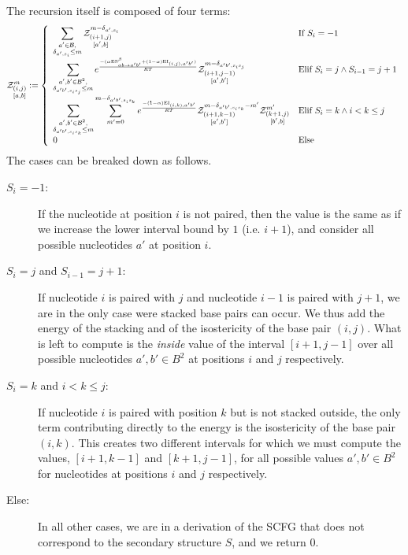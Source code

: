The recursion itself is composed of four terms:
$$
	\Z{i,j}{m}{a,b}:=\left\{
  \begin{array}{ll}
  		\displaystyle
      \sum_{\substack{a'\in \B,\\ \Kron_{a',s_i}\le m}}  
      \Z{i+1,j}{m-\Kron_{a',s_i}}{a',b} & \text{If }S_{i}=-1\\
      \displaystyle
      \sum_{\substack{a',b'\in \B^2,\\ \Kron_{a'b',s_is_j}\le m}}
			 e^{\frac{-(\alpha \text{ES}^\beta_{a b \to a' b'}+(1-\alpha)\text{EI}_{(i,j),a'b'})}{RT}}
			 \Z{i+1,j-1}{m-\Kron_{a'b',s_is_j}}{a',b'}&
			 \text{Elif }S_i=j \land S_{i-1}=j+1\\
			 \displaystyle
      \sum_{\substack{a',b'\in \B^2,\\ \Kron_{a'b',s_is_k}\le m}}
      \sum_{m'=0}^{m-\Kron_{a'b',s_is_k}}
   		 e^{\frac{-(1-\alpha)\text{EI}_{(i,k),a'b'}}{RT}}
      \Z{i+1,k-1}{m-\Kron_{a'b',s_is_k}-m'}{a',b'}
      \Z{k+1,j}{m'}{b',b} & \text{Elif }S_i=k \land i < k \leq j\\
      0 &\text{Else}
	\end{array}\right.
$$
The cases can be breaked down as follows.
\begin{description}
\item[$S_{i}=-1$:] If the nucleotide at position $i$ is not paired, then the value is the same
as if we increase the lower interval bound by $1$ (i.e. $i+1$), and consider all possible
 nucleotides $a'$ at position $i$. 
\item[$S_i=j$ and $S_{i-1}=j+1$:] If nucleotide $i$ is paired with $j$ and nucleotide $i-1$ is
paired with $j+1$, we are in the only case were stacked base pairs can occur. We thus add
the energy of the stacking and of the isostericity of the base pair $(i,j)$. What is left
to compute is the \emph{inside} value of the interval $[i+1,j-1]$ over all possible nucleotides 
$a',b'\in B^2$ at positions $i$ and $j$ respectively.
\item[$S_i=k$ and $i<k \leq j$:] If nucleotide $i$ is paired with position $k$ 
but is not stacked outside, the 
only term contributing directly to the energy is the isostericity of the base pair $(i,k)$. This 
creates
two different intervals for which we must compute the values, $[i+1,k-1]$ and $[k+1,j-1]$, for 
all possible values $a',b'\in B^2$ for nucleotides at positions $i$ and $j$ respectively.
\item[Else:] In all other cases, we are in a derivation of the SCFG that does not correspond to the 
secondary structure $S$, and we return $0$.

\end{description}

